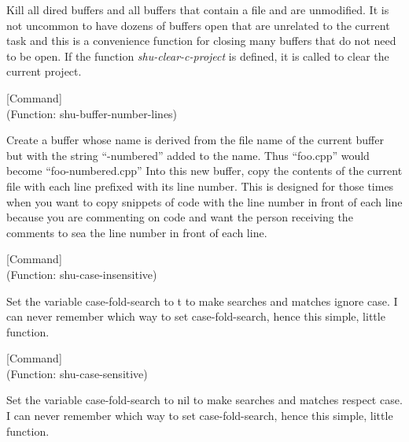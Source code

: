 \begin{doc-string}
Kill all dired buffers and all buffers that contain a file and are unmodified.
It is not uncommon to have dozens of buffers open that are unrelated to the current task
and this is a convenience function for closing many buffers that do not need to
be open.
If the function \emph{shu-clear-c-project} is defined, it is called to clear the current
project.
\end{doc-string}

\vspace{1em}
\noindent
{}
\usebox{\funcname}
 \hfill [Command]\\%
 (Function: shu-buffer-number-lines)

\begin{doc-string}
Create a buffer whose name is derived from the file name of the current
buffer but with the string ``-numbered'' added to the name.  Thus ``foo.cpp''
would become ``foo-numbered.cpp'' Into this new buffer, copy the contents of the
current file with each line prefixed with its line number.  This is designed for
those times when you want to copy snippets of code with the line number in front
of each line because you are commenting on code and want the person receiving
the comments to sea the line number in front of each line.
\end{doc-string}

\vspace{1em}
\noindent
{}
\usebox{\funcname}
 \hfill [Command]\\%
 (Function: shu-case-insensitive)

\begin{doc-string}
Set the variable case-fold-search to t to make searches and matches ignore
case.  I can never remember which way to set case-fold-search, hence this
simple, little function.
\end{doc-string}

\vspace{1em}
\noindent
{}
\usebox{\funcname}
 \hfill [Command]\\%
 (Function: shu-case-sensitive)

\begin{doc-string}
Set the variable case-fold-search to nil to make searches and matches respect
case.  I can never remember which way to set case-fold-search, hence this
simple, little function.
\end{doc-string}

